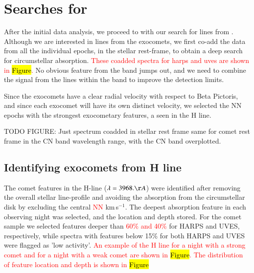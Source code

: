 \documentclass{aa}
\newcommand{\bp}{Beta Pictoris}
\begin{document}
%

\section{Searches for }\label{sect:CNsearch}

After the initial data analysis, we proceed to with our search for lines from .
%
Although we are interested in lines from the exocomets, we first co-add the data from all the individual epochs, in the stellar rest-frame, to obtain a deep search for circumstellar  absorption.
%
\textcolor{red}{These coadded spectra for \ac{harps} and \ac{uves} are shown in \hl{Figure}.}
%
No obvious feature from the  band jumps out, and we need to combine the signal from the lines within the  band to improve the detection limits.

Since the exocomets have a clear radial velocity with respect to \bp{}, and since each exocomet will have its own distinct velocity, we selected the NN epochs with the strongest exocometary features, a seen in the  H line. 

TODO FIGURE: Just spectrum coadded in stellar rest frame same for comet rest frame in the CN band wavelength range, with the CN band overplotted.

\subsection{Identifying exocomets from  H line}\label{sect:FEBid}
The comet features in the  H-line ($\lambda=3968. \AA$) were identified after removing the overall stellar line-profile and avoiding the absorption from the circumstellar disk by excluding the central \textcolor{red}{NN} km\,s$^{-1}$. The deepest absorption feature in each observing night was selected, and the location and depth stored. For the comet sample we selected features deeper than \textcolor{red}{60\% and 40\%} for HARPS and UVES, respectively, while spectra with features below 15\% for both HARPS and UVES were flagged as 'low activity'. \textcolor{red}{An example of the  H line for a night with a strong comet and for a night with a weak comet are shown in \hl{Figure}. The distribution of feature location and depth is shown in \hl{Figure}}
\end{document}
